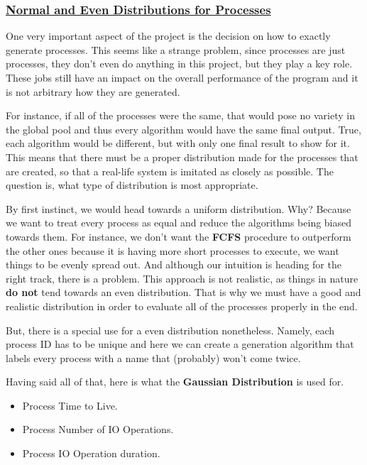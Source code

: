 \documentclass{article}
\begin{document}
\subsubsection{\underline{Normal and Even Distributions for Processes}}

One very important aspect of the project is the decision on how to exactly generate processes. This seems like a strange problem, since processes are just processes, they don't even do anything in this project, but they play a key role. These jobs still have an impact on the overall performance of the program and it is not arbitrary how they are generated.

For instance, if all of the processes were the same, that would pose no variety in the global pool and thus every algorithm would have the same final output. True, each algorithm would be different, but with only one final result to show for it. This means that there must be a proper distribution made for the processes that are created, so that a real-life system is imitated as closely as possible. The question is, what type of distribution is most appropriate.

By first instinct, we would head towards a uniform distribution. Why? Because we want to treat every process as equal and reduce the algorithms being biased towards them. For instance, we don't want the \textbf{FCFS} procedure to outperform the other ones because it is having more short processes to execute, we want things to be evenly spread out. And although our intuition is heading for the right track, there is a problem. This approach is not realistic, as things in nature \textbf{do not} tend towards an even distribution. That is why we must have a good and realistic distribution in order to evaluate all of the processes properly in the end.

But, there is a special use for a even distribution nonetheless. Namely, each process ID has to be unique and here we can create a generation algorithm that labels every process with a name that (probably) won't come twice.

Having said all of that, here is what the \textbf{Gaussian Distribution} is used for.

\begin{itemize}
\item Process Time to Live.
\item Process Number of IO Operations.
\item Process IO Operation duration.
\end{itemize}
\end{document}
